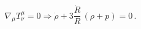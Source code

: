 \begin{equation}
\nabla_{\mu}T_{\nu}^{\mu}=0\Longrightarrow \dot{\rho}+
3\frac{\dot{R}}{R}\,(\rho+p)=0\,.
\end{equation}

